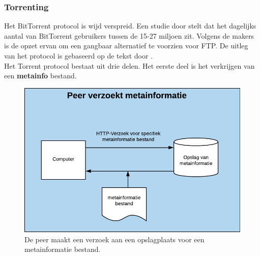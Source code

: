  
 \subsubsection{Torrenting}
 \label{torrenting}
Het BitTorrent protocol is wijd verspreid. Een studie door \textcite{Wang2013} stelt dat het dagelijks aantal van BitTorrent gebruikers tussen de 15-27 miljoen zit. Volgens de makers is de opzet ervan om een gangbaar alternatief te voorzien voor FTP. De uitleg van het protocol is gebaseerd op de tekst door \textcite{Fonseca2005}.\\ 

Het Torrent protocol bestaat uit drie delen. Het eerste deel is het verkrijgen van een \textbf{metainfo} bestand.\\

\begin{figure}[h!]
\centering
\includegraphics[scale=.4]{torrent-1.png}
\caption[Peer metainformatie stap  - Torrenting 1]{De peer maakt een verzoek aan een opslagplaats voor een metainformatie bestand.}
\end{figure}


